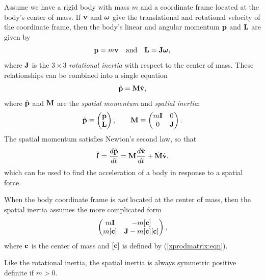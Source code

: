 Assume we have a rigid body with mass $m$ and a coordinate frame
located at the body's center of mass.  If ${\bf v}$ and $\boldsymbol\omega$ give the
translational and rotational velocity of the coordinate frame, then
the body's linear and angular momentum ${\bf p}$ and ${\bf L}$ are given by
%
\begin{equation}
{\bf p} = m {\bf v} \quad \text{and} \quad {\bf L} = {\bf J} \boldsymbol\omega,
\label{momenta:eqn}
\end{equation}
%
where ${\bf J}$ is the $3 \times 3$ {\it rotational inertia} with respect
to the center of mass. These relationships can be combined into a
single equation
%
\begin{equation}
\hat{{\bf p}} = {\bf M} \hat{{\bf v}},
\label{momentum:eqn}
\end{equation}
%
where $\hat{{\bf p}}$ and ${\bf M}$ are the {\it spatial momentum} and
{\it spatial inertia}:
%
\begin{equation}
\hat{{\bf p}} \equiv \left(\begin{matrix} {\bf p} \\ {\bf L} \end{matrix}\right), \qquad
{\bf M} \equiv \left(\begin{matrix} m {\bf I} & 0 \\ 0 & {\bf J} \end{matrix}\right).
\end{equation}
%
The spatial momentum satisfies Newton's second law, so that
%
\begin{equation}
\hat{{\bf f}} = \frac{d \hat{{\bf p}}}{dt} = {\bf M} \frac{d \hat{{\bf v}}}{dt} + \dot{{\bf M}} \hat{{\bf v}},
\end{equation}
%
which can be used to find the acceleration of a body in response to a
spatial force.

When the body coordinate frame is {\it not} located at the center of
mass, then the spatial inertia assumes the more complicated form
%
\begin{equation}
\left(\begin{matrix} 
m {\bf I} & -m [{\bf c}] \\ m [{\bf c}] & {\bf J} - m[{\bf c}][{\bf c}]
\end{matrix}\right),
\end{equation}
%
where ${\bf c}$ is the center of mass and $[{\bf c}]$ is defined by
(\ref{xprodmatrix:eqn}).

Like the rotational inertia, the spatial inertia is always symmetric
positive definite if $m > 0$.
